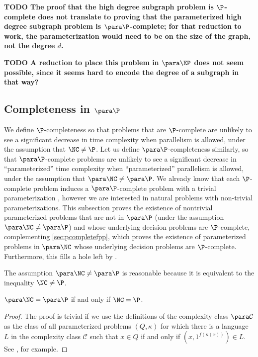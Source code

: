 \documentclass{article}
\newcommand{\todo}[1]{\textbf{TODO #1}}
\begin{document}

\todo{The proof that the high degree subgraph problem is $\P$-complete does not translate to proving that the parameterized high degree subgraph problem is $\para \P$-complete; for that reduction to work, the parameterization would need to be on the size of the graph, not the degree $d$.}

\todo{A reduction to place this problem in $\para \EP$ does not seem possible, since it seems hard to encode the degree of a subgraph in that way?}

\subsection{Completeness in \texorpdfstring{$\para \P$}{paraP}}

We define $\P$-completeness so that problems that are $\P$-complete are unlikely to see a significant decrease in time complexity when parallelism is allowed, under the assumption that $\NC \neq \P$.
Let us define $\para \P$-completeness similarly, so that $\para \P$-complete problems are unlikely to see a significant decrease in ``parameterized'' time complexity when ``parameterized'' parallelism is allowed, under the assumption that $\para \NC \neq \para \P$.
We already know that each $\P$-complete problem induces a $\para \P$-complete problem with a trivial parameterization \autocite[Proposition~14]{fg03}, however we are interested in natural problems with non-trivial parameterizations.
This subsection proves the existence of nontrivial parameterized problems that are not in $\para \P$ (under the assumption $\para \NC \neq \para \P$) and whose underlying decision problems are $\P$-complete, complementing \autoref{sec:pcompletefpp}, which proves the existence of parameterized problems in $\para \NC$ whose underlying decision problems are $\P$-complete.
Furthermore, this fills a hole left by \autocite{est15}.

The assumption $\para \NC \neq \para \P$ is reasonable because it is equivalent to the inequality $\NC \neq \P$.

\begin{proposition}
  $\para \NC = \para \P$ if and only if $\NC = \P$.
\end{proposition}
\begin{proof}
  The proof is trivial if we use the definitions of the complexity class $\para \mathcal{C}$ as the class of all parameterized problems $(Q, \kappa)$ for which there is a language $L$ in the complexity class $\mathcal{C}$ such that $x \in Q$ if and only if $(x, 1^{f(\kappa(x))}) \in L$.
  See \autocite[Proposition~8]{fg03}, for example.
\end{proof}
\end{document}
